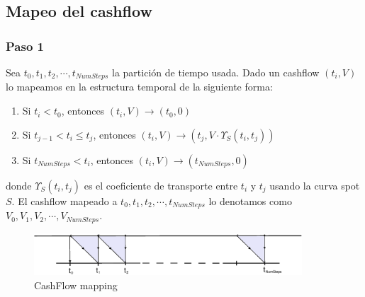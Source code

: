
\subsection{Mapeo del cashflow}

\subsubsection{Paso 1}

Sea $t_0, t_1, t_2, \cdots, t_{NumSteps}$ la partici\'on de tiempo usada.
Dado un cashflow $(t_i,V)$ lo mapeamos en la estructura temporal de la
siguiente forma:

\begin{enumerate}
\item Si $t_i < t_0$, entonces $(t_i,V) \longrightarrow (t_0,0)$
\item Si $t_{j-1} < t_i \leq t_j$, entonces $(t_i,V) \longrightarrow (t_j,V \cdot \Upsilon_S(t_i,t_j))$
\item Si $t_{NumSteps} < t_i$, entonces $(t_i,V) \longrightarrow (t_{NumSteps},0)$
\end{enumerate}

donde $\Upsilon_S(t_i,t_j)$ es el coeficiente de transporte entre $t_i$ y $t_j$
usando la curva spot $S$. El cashflow mapeado a 
$t_0, t_1, t_2, \cdots, t_{NumSteps}$ lo denotamos como
$V_0, V_1, V_2, \cdots, V_{NumSteps}$.

\begin{figure}[!hb]
\begin{center}
\includegraphics[width=10cm,angle=0]{./images/cashflowmapping.eps}
\caption{CashFlow mapping}
\label{timetranches}
\end{center}
\end{figure}

